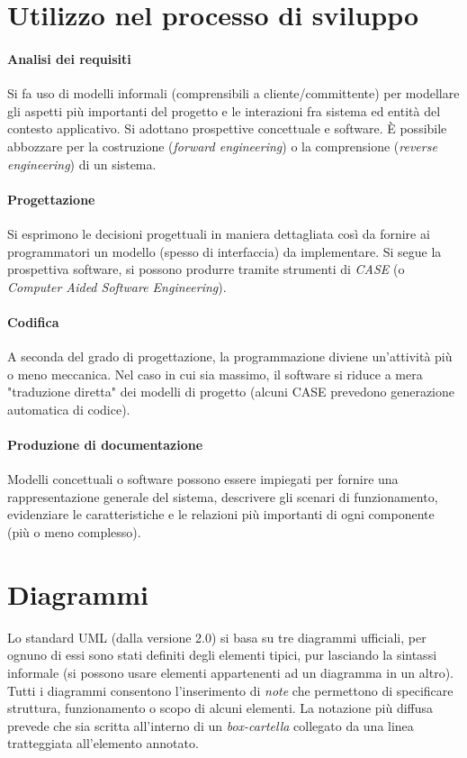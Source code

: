 \section{Utilizzo nel processo di sviluppo}

\paragraph{Analisi dei requisiti} Si fa uso di modelli informali (comprensibili a cliente/committente) per modellare gli aspetti più importanti del progetto e le interazioni fra sistema ed entità del contesto applicativo. Si adottano prospettive concettuale e software. È possibile abbozzare per la costruzione (\textit{forward engineering}) o la comprensione (\textit{reverse engineering}) di un sistema.

\paragraph{Progettazione} Si esprimono le decisioni progettuali in maniera dettagliata così da fornire ai programmatori un modello (spesso di interfaccia) da implementare. Si segue la prospettiva software, si possono produrre tramite strumenti di \textit{CASE} (o \textit{Computer Aided Software Engineering}). 

\paragraph{Codifica} A seconda del grado di progettazione, la programmazione diviene un'attività più o meno meccanica. Nel caso in cui sia massimo, il software si riduce a mera "traduzione diretta" dei modelli di progetto (alcuni CASE prevedono generazione automatica di codice).

\paragraph{Produzione di documentazione} Modelli concettuali o software possono essere impiegati per fornire una rappresentazione generale del sistema, descrivere gli scenari di funzionamento, evidenziare le caratteristiche e le relazioni più importanti di ogni componente (più o meno complesso).

\section{Diagrammi}

Lo standard UML (dalla versione 2.0) si basa su tre diagrammi ufficiali, per ognuno di essi sono stati definiti degli elementi tipici, pur lasciando la sintassi informale (si possono usare elementi appartenenti ad un diagramma in un altro). Tutti i diagrammi consentono l'inserimento di \textit{note} che permettono di specificare struttura, funzionamento o scopo di alcuni elementi. La notazione più diffusa prevede che sia scritta all'interno di un \textit{box-cartella} collegato da una linea tratteggiata all'elemento annotato.

